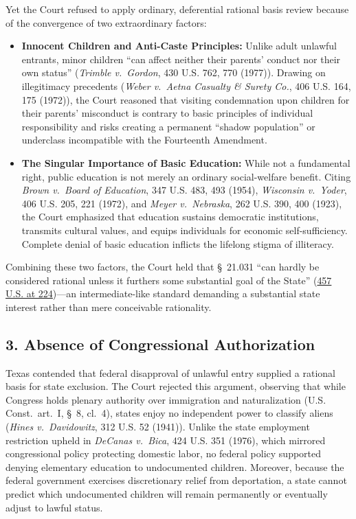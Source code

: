 \documentclass[12pt]{article}
\begin{document}
Yet the Court refused to apply ordinary, deferential rational basis review because of the convergence of two extraordinary factors:
\begin{itemize}
    \item \textbf{Innocent Children and Anti-Caste Principles:} Unlike adult unlawful entrants, minor children ``can affect neither their parents' conduct nor their own status'' (\textit{Trimble v.\ Gordon}, 430 U.S. 762, 770 (1977)). Drawing on illegitimacy precedents (\textit{Weber v.\ Aetna Casualty \& Surety Co.}, 406 U.S. 164, 175 (1972)), the Court reasoned that visiting condemnation upon children for their parents' misconduct is contrary to basic principles of individual responsibility and risks creating a permanent ``shadow population'' or underclass incompatible with the Fourteenth Amendment.
    \item \textbf{The Singular Importance of Basic Education:} While not a fundamental right, public education is not merely an ordinary social-welfare benefit. Citing \textit{Brown v.\ Board of Education}, 347 U.S. 483, 493 (1954), \textit{Wisconsin v.\ Yoder}, 406 U.S. 205, 221 (1972), and \textit{Meyer v.\ Nebraska}, 262 U.S. 390, 400 (1923), the Court emphasized that education sustains democratic institutions, transmits cultural values, and equips individuals for economic self-sufficiency. Complete denial of basic education inflicts the lifelong stigma of illiteracy.
\end{itemize}

Combining these two factors, the Court held that \S~21.031 ``can hardly be considered rational unless it furthers some substantial goal of the State'' (\href{https://www.law.cornell.edu/supremecourt/text/457/202}{457 U.S. at 224})---an intermediate-like standard demanding a substantial state interest rather than mere conceivable rationality.

\subsection*{3. Absence of Congressional Authorization}
Texas contended that federal disapproval of unlawful entry supplied a rational basis for state exclusion. The Court rejected this argument, observing that while Congress holds plenary authority over immigration and naturalization (U.S. Const.\ art.\ I, \S~8, cl.\ 4), states enjoy no independent power to classify aliens (\textit{Hines v.\ Davidowitz}, 312 U.S. 52 (1941)). Unlike the state employment restriction upheld in \textit{DeCanas v.\ Bica}, 424 U.S. 351 (1976), which mirrored congressional policy protecting domestic labor, no federal policy supported denying elementary education to undocumented children. Moreover, because the federal government exercises discretionary relief from deportation, a state cannot predict which undocumented children will remain permanently or eventually adjust to lawful status.
\end{document}
